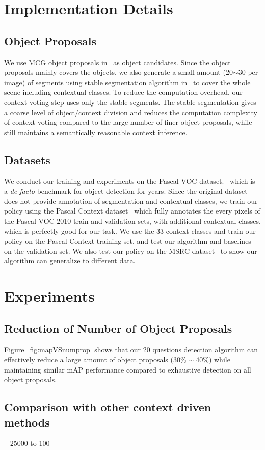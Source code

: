 \section{Implementation Details}
\subsection{Object Proposals}
We use MCG object proposals in~\cite{arbelaez2014multiscale} as object candidates. Since the object proposals mainly covers the objects,  we also generate a small amount (20$\sim$30 per image) of segments using stable segmentation algorithm in~\cite{chen2011piecing} to cover the whole scene including contextual classes. To reduce the computation overhead, our context voting step uses only the stable segments. The stable segmentation gives a coarse level of object/context division and reduces the computation complexity of context voting compared to the large number of finer object proposals, while still maintains a semantically reasonable context inference. 

\subsection{Datasets}
We conduct our training and experiments on the Pascal VOC dataset.~\cite{Everingham10} which is a \textit{de facto} benchmark for object detection for years. Since the original dataset does not provide annotation of segmentation and contextual classes, we train our policy using the Pascal Context dataset~\cite{mottaghi2014role} which fully annotates the every pixels of the Pascal VOC 2010 train and validation sets, with additional contextual classes, which is perfectly good for our task. We use the 33 context classes and train our policy on the Pascal Context training set, and test our algorithm and baselines on the validation set. We also test our policy on the MSRC dataset~\cite{shotton2006textonboost} to show our algorithm can generalize to different data. 

\section{Experiments}

\subsection{Reduction of Number of Object Proposals}

Figure~\ref{fig:mapVSnumprop} shows that our 20 questions detection algorithm can effectively reduce a large amount of object proposals ($30\% \sim 40\%$) while maintaining similar mAP performance compared to exhaustive detection on all object proposals.  

\subsection{Comparison with other context driven methods}

~\cite{bogdan2012context} 25000 to 100 
